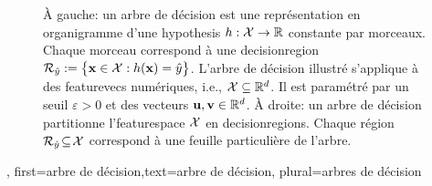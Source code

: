 {{\begin{figure}[H]
\begin{minipage}{.45\textwidth}
			\end{minipage}
			\caption{À gauche: un arbre de décision est une représentation en organigramme d’une \gls{hypothesis} $h: \mathcal{X} \rightarrow \mathbb{R}$ constante par morceaux. Chaque morceau correspond à une \gls{decisionregion} $\mathcal{R}_{\hat{y}} := \big\{ {\bf x} \in  \mathcal{X}: h({\bf x}) = \hat{y} \big\}$. 
				L’arbre de décision illustré s’applique à des \glspl{featurevec} numériques, i.e., $\mathcal{X} \subseteq \mathbb{R}^{d}$. Il est paramétré par un seuil $\varepsilon > 0$ et des vecteurs ${\bf u}, {\bf v} \in \mathbb{R}^{d}$. 
				À droite: un arbre de décision partitionne l’\gls{featurespace} $\mathcal{X}$ en \glspl{decisionregion}. Chaque région $\mathcal{R}_{\hat{y}} \!\subseteq\!\mathcal{X}$ correspond à une feuille particulière de l’arbre.}
			\label{fig_decision_tree}
		\end{figure}
	},
	first={arbre de décision},text={arbre de décision}, plural={arbres de décision}
}

